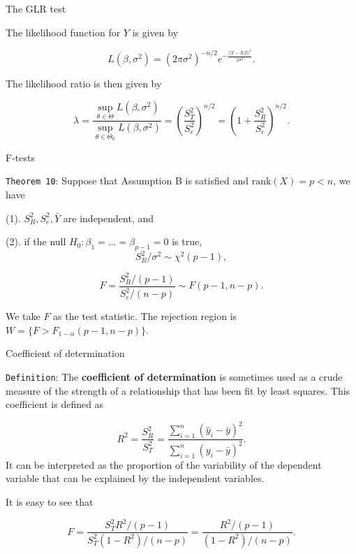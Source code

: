 \documentclass[ignorenonframetext,]{beamer}
\begin{document}
\begin{frame}{The GLR test}
\protect\hypertarget{the-glr-test}{}

The likelihood function for \(Y\) is given by

\[L(\beta,\sigma^2) = (2\pi \sigma^2)^{-n/2} e^{-\frac{||Y-X\beta||^2}{2\sigma^2}}.\]

The likelihood ratio is then given by

\[\lambda = \frac{\sup_{\theta\in\Theta}L(\beta,\sigma^2)}{\sup_{\theta\in\Theta_0}L(\beta,\sigma^2)} = \left(\frac{S_T^2}{S_e^2}\right)^{n/2}= \left(1+\frac{S_R^2}{S_e^2}\right)^{n/2}.\]

\end{frame}

\begin{frame}[fragile]{F-tests}
\protect\hypertarget{f-tests}{}

\texttt{Theorem\ 10}: Suppose that Assumption B is satisfied and
\(\mathrm{rank}(X)=p<n\), we have

(1). \(S_R^2,S_e^2,\bar Y\) are independent, and

(2). if the null \(H_0:\beta_1=\dots=\beta_{p-1}=0\) is true,
\[S_R^2/\sigma^2\sim\chi^2(p-1),\]

\[F=\frac{S_R^2/(p-1)}{S_e^2/(n-p)}\sim F(p-1,n-p).\]

We take \(F\) as the test statistic. The rejection region is
\(W=\{F>F_{1-\alpha}(p-1,n-p)\}\).

\end{frame}

\begin{frame}[fragile]{Coefficient of determination}
\protect\hypertarget{coefficient-of-determination}{}

\texttt{Definition}: The \textbf{coefficient of determination} is
sometimes used as a crude measure of the strength of a relationship that
has been fit by least squares. This coefficient is defined as

\[R^2 =\frac{S_R^2}{S_T^2}=\frac{\sum_{i=1}^n(\hat y_i-\bar y)^2}{\sum_{i=1}^n(y_i-\bar y)^2}.\]
It can be interpreted as the proportion of the variability of the
dependent variable that can be explained by the independent variables.

It is easy to see that

\[F = \frac{S_T^2 R^2/(p-1)}{S_T^2(1-R^2)/(n-p)}=\frac{ R^2/(p-1)}{(1-R^2)/(n-p)}.\]

\end{frame}
\end{document}
